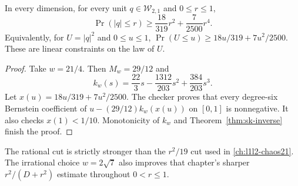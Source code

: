 \begin{corollary}\label{cor:sk-cut}
In every dimension, for every unit $q\in\mathcal W_{2,1}$ and $0\le r\le1$,
\begin{equation}\label{eq:sk-cut}
 \boxed{\Pr(|q|\le r)\ge\frac{18}{319}r^2+\frac7{2500}r^4.}
\end{equation}
Equivalently, for $U=|q|^2$ and $0\le u\le1$,
$\Pr(U\le u)\ge18u/319+7u^2/2500$. These are linear constraints on the law of $U$.
\end{corollary}
\begin{proof}
Take $w=21/4$. Then $M_w=29/12$ and
\[
 k_w(s)=\frac{22}{3}s-\frac{1312}{203}s^2+\frac{384}{203}s^3.
\]
Let $x(u)=18u/319+7u^2/2500$. The checker proves that every degree-six Bernstein coefficient of $u-(29/12)k_w(x(u))$ on $[0,1]$ is nonnegative. It also checks $x(1)<1/10$. Monotonicity of $k_w$ and Theorem~\ref{thm:sk-inverse} finish the proof.
\end{proof}
The rational cut is strictly stronger than the $r^2/19$ cut used in \autoref{ch:l1l2-chaos21}. The irrational choice $w=2\sqrt7$ also improves that chapter's sharper $r^2/(D+r^2)$ estimate throughout $0<r\le1$.

